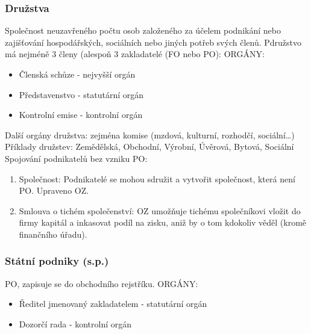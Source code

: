         \subsubsection{Družstva}
            Společnost neuzavřeného počtu osob založeného za účelem podnikání nebo zajišťování hospodářských, sociálních nebo jiných potřeb svých členů.
            Pdružstvo má nejméně 3 členy (alespoň 3 zakladatelé (FO nebo PO):
            ORGÁNY:
            \begin{itemize}
                \item Členská schůze - nejvyšší orgán
                \item Představenstvo - statutární orgán
                \item Kontrolní emise - kontrolní orgán							
            \end{itemize}
            Další orgány družstva: zejména komise (mzdová, kulturní, rozhodčí, sociální\ldots)
            Příklady družstev: Zemědělská, Obchodní, Výrobní, Úvěrová, Bytová, Sociální
            Spojování podnikatelů bez vzniku PO:
            \begin{enumerate}
                \item Společnost: Podnikatelé se mohou sdružit a vytvořit společnost, která není PO. Upraveno OZ.
                \item Smlouva o tichém společenství: OZ umožňuje tichému společníkovi vložit do firmy kapitál a inkasovat podíl na zisku, aniž by o tom kdokoliv věděl (kromě finančního úřadu).
            \end{enumerate}


        \subsubsection{Státní podniky (s.p.)}
            PO, zapisuje se do obchodního rejstříku.
            ORGÁNY:
                \begin{itemize}
                    \item Ředitel jmenovaný zakladatelem - statutární orgán
                    \item Dozorčí rada - kontrolní orgán
                \end{itemize}

